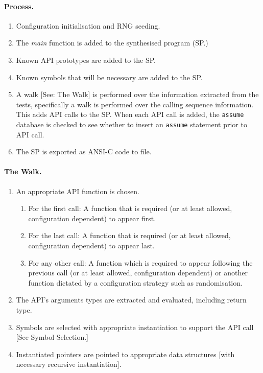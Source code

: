 \documentclass[EPiCempty]{easychair}
\begin{document}
\paragraph{Process.}
\begin{enumerate}
	\item Configuration initialisation and RNG seeding.
	\item The \textit{main} function is added to the synthesised program (SP.)
	\item Known API prototypes are added to the SP.
	\item Known symbols that will be necessary are added to the SP.
	\item A walk [See: The Walk] is performed over the information extracted from the tests, specifically a walk is performed over the calling sequence information.  This adds API calls to the SP.  When each API call is added, the \texttt{assume} database is checked to see whether to insert an \texttt{assume} statement prior to API call.
	\item The SP is exported as ANSI-C code to file.	
\end{enumerate}

\paragraph{The Walk.}
\begin{enumerate}
	\item An appropriate API function is chosen.
	\begin{enumerate}[label=(\alph*)]
		\item For the first call:  A function that is required (or at least allowed, configuration dependent) to appear first.
		\item For the last call:   A function that is required (or at least allowed, configuration dependent) to appear last.
		\item For any other call:  A function which is required to appear following the previous call (or at least allowed, configuration dependent) or another function dictated by a configuration strategy such as randomisation.
	\end{enumerate}
	\item The API's arguments types are extracted and evaluated, including return type.
	\item Symbols are selected with appropriate instantiation to support the API call [See Symbol Selection.]
	\item Instantiated pointers are pointed to appropriate data structures [with necessary recursive instantiation].
\end{enumerate}
\end{document}
